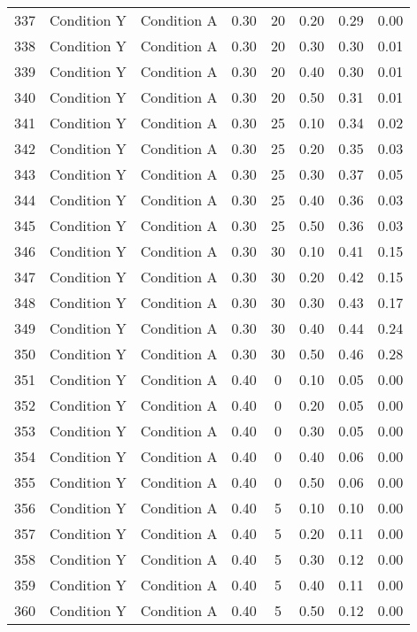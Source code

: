 \begin{landscape}
\begin{longtable}{cc cc cc cc}
  337 & Condition Y & Condition A & 0.30 &  20 & 0.20 & 0.29 & 0.00 \\ 
  338 & Condition Y & Condition A & 0.30 &  20 & 0.30 & 0.30 & 0.01 \\ 
  339 & Condition Y & Condition A & 0.30 &  20 & 0.40 & 0.30 & 0.01 \\ 
  340 & Condition Y & Condition A & 0.30 &  20 & 0.50 & 0.31 & 0.01 \\ 
  341 & Condition Y & Condition A & 0.30 &  25 & 0.10 & 0.34 & 0.02 \\ 
  342 & Condition Y & Condition A & 0.30 &  25 & 0.20 & 0.35 & 0.03 \\ 
  343 & Condition Y & Condition A & 0.30 &  25 & 0.30 & 0.37 & 0.05 \\ 
  344 & Condition Y & Condition A & 0.30 &  25 & 0.40 & 0.36 & 0.03 \\ 
  345 & Condition Y & Condition A & 0.30 &  25 & 0.50 & 0.36 & 0.03 \\ 
  346 & Condition Y & Condition A & 0.30 &  30 & 0.10 & 0.41 & 0.15 \\ 
  347 & Condition Y & Condition A & 0.30 &  30 & 0.20 & 0.42 & 0.15 \\ 
  348 & Condition Y & Condition A & 0.30 &  30 & 0.30 & 0.43 & 0.17 \\ 
  349 & Condition Y & Condition A & 0.30 &  30 & 0.40 & 0.44 & 0.24 \\ 
  350 & Condition Y & Condition A & 0.30 &  30 & 0.50 & 0.46 & 0.28 \\ 
  351 & Condition Y & Condition A & 0.40 &   0 & 0.10 & 0.05 & 0.00 \\ 
  352 & Condition Y & Condition A & 0.40 &   0 & 0.20 & 0.05 & 0.00 \\ 
  353 & Condition Y & Condition A & 0.40 &   0 & 0.30 & 0.05 & 0.00 \\ 
  354 & Condition Y & Condition A & 0.40 &   0 & 0.40 & 0.06 & 0.00 \\ 
  355 & Condition Y & Condition A & 0.40 &   0 & 0.50 & 0.06 & 0.00 \\ 
  356 & Condition Y & Condition A & 0.40 &   5 & 0.10 & 0.10 & 0.00 \\ 
  357 & Condition Y & Condition A & 0.40 &   5 & 0.20 & 0.11 & 0.00 \\ 
  358 & Condition Y & Condition A & 0.40 &   5 & 0.30 & 0.12 & 0.00 \\ 
  359 & Condition Y & Condition A & 0.40 &   5 & 0.40 & 0.11 & 0.00 \\ 
  360 & Condition Y & Condition A & 0.40 &   5 & 0.50 & 0.12 & 0.00 \\ 

\end{longtable}
\end{landscape}
